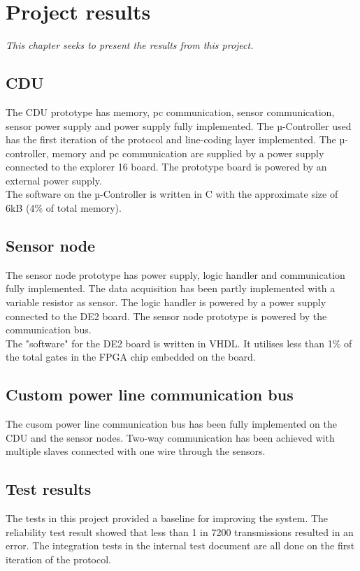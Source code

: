 \chapter{Project results}
\textit{This chapter seeks to present the results from this project.}
\section{CDU}
The CDU prototype has memory, pc communication, sensor communication, sensor power supply and power supply fully implemented. The µ-Controller used has the first iteration of the protocol and line-coding layer implemented. The µ-controller, memory and pc communication are supplied by a power supply connected to the explorer 16 board. The prototype board is powered by an external power supply.\\
The software on the µ-Controller is written in C with the approximate size of 6kB (4\% of total memory).\\

\section{Sensor node}
The sensor node prototype has power supply, logic handler and communication fully implemented. The data acquisition has been partly implemented with a variable resistor as sensor. The logic handler is powered by a power supply connected to the DE2 board. The sensor node prototype is powered by the communication bus.\\
The "software" for the DE2 board is written in VHDL. It utilises less than 1\% of the total gates in the FPGA chip embedded on the board.

\section{Custom power line communication bus}
The cusom power line communication bus has been fully implemented on the CDU and the sensor nodes. Two-way communication has been achieved with multiple slaves connected with one wire through the sensors.

\section{Test results}
The tests in this project provided a baseline for improving the system. The reliability test result showed that less than 1 in 7200 transmissions resulted in an error. The integration tests in the internal test document are all done on the first iteration of the protocol. 



